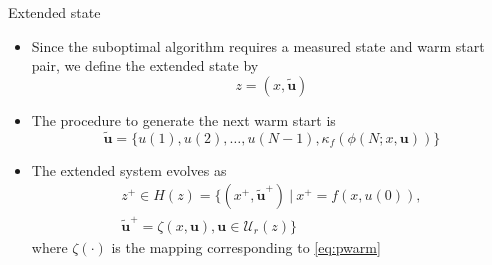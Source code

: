 \documentclass{beamer}
\newcommand{\useq}{\mathbf{u}}
\begin{document}



\begin{frame}{Extended state}

\begin{itemize}
\item Since the suboptimal algorithm requires a measured state and warm start
pair, we define the extended state by 
\begin{equation*}
z = (x,\tilde{\mathbf{u}})
\end{equation*}

\item The procedure to generate the next warm start is
\begin{equation}
\tilde{\mathbf{u}} = \{u(1),u(2),\dots,u(N-1),\kappa_f(\phi(N;x,\mathbf{u}))\}
\label{eq:pwarm}
\end{equation}

\item The extended system evolves as
\begin{multline}
z^+ \in H(z) = \{(x^+,\tilde{\mathbf{u}}^+) \ | \ x^+ =
f(x,u(0)), \\
\tilde{\mathbf{u}}^+ = \zeta(x,\mathbf{u}), \mathbf{u} \in \mathcal{U}_r(z)\}
\end{multline}
where $\zeta(\cdot)$ is the mapping corresponding to \eqref{eq:pwarm} 
\end{itemize}

\end{frame}


\end{document}
